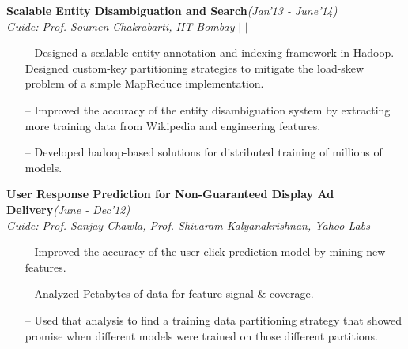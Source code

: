 \documentclass[margin,line]{templates/resume}
\newcommand{\myhref}[3][blue]{\href{#2}{\color{#1}{#3}}}
\newcommand{\compresslist}{%
\setlength{\itemsep}{3pt}%
\setlength{\parskip}{0pt}%
\setlength{\parsep}{0pt}%
}
\begin{document}
\begin{resume}
\vspace{-0.2cm}    
\textsf{\textbf{Scalable Entity Disambiguation and Search}}\hfill\textit{\small(Jan'13 - June'14)}
\\ {\textit{Guide: \href{https://www.cse.iitb.ac.in/~soumen/}{Prof. Soumen Chakrabarti}, IIT-Bombay}}\hfill{\myhref[darkblue]{https://shatu.github.io/\#iitb}{Web} $|$ \myhref[darkblue]{https://shatu.github.io/papers/Web-scale_Entity_Annotation_Using_MapReduce.pdf}{Publication} $|$ \myhref[darkblue]{https://www.cse.iitb.ac.in/~soumen/doc/CSAW/}{CSAW}}
\vspace{0.05cm}
\begin{itemize}[leftmargin=*]\compresslist
    \item[--]Designed a scalable entity annotation and indexing framework in Hadoop. Designed custom-key partitioning strategies to mitigate the load-skew problem of a simple MapReduce implementation.
    \item[--]Improved the accuracy of the entity disambiguation system by extracting more training data from Wikipedia and engineering features.
    \item[--]Developed hadoop-based solutions for distributed training of millions of models. 
\end{itemize}

\vspace{-0.2cm}
\textsf{\textbf{User Response Prediction for Non-Guaranteed Display Ad Delivery}}\hfill\textit{\small(June - Dec'12)}
\\ {\textit{Guide: \href{http://www.pmg.it.usyd.edu.au/}{Prof. Sanjay Chawla}, \href{https://www.cse.iitb.ac.in/~shivaram/}{Prof. Shivaram Kalyanakrishnan}, Yahoo Labs}} \hfill{\myhref[darkblue]{https://shatu.github.io/\#labs}{Web}}
\normalsize
\vspace{0.05cm}
\begin{itemize}[leftmargin=*]\compresslist
    \item[--]Improved the accuracy of the user-click prediction model by mining new features. 
    \item[--]Analyzed Petabytes of data for feature signal \& coverage.
    \item[--]Used that analysis to find a training data partitioning strategy that showed promise when different models were trained on those different partitions.
\end{itemize}


\end{resume}
\end{document}
